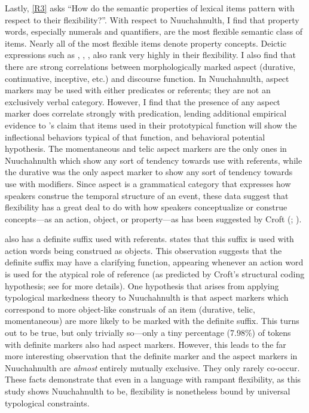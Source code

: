 Lastly, \ref{R3} asks \enquote{How do the semantic properties of lexical items pattern with respect to their flexibility?}. With respect to Nuuchahnulth, I find that property words, especially numerals and quantifiers, are the most flexible semantic class of items. Nearly all of the most flexible items denote property concepts. Deictic expressions such as , , ,  also rank very highly in their flexibility. I also find that there are strong correlations between morphologically marked aspect (durative, continuative, inceptive, etc.) and discourse function. In Nuuchahnulth, aspect markers may be used with either predicates or referents; they are not an exclusively verbal category. However, I find that the presence of any aspect marker does correlate strongly with predication, lending additional empirical evidence to \citeauthor{HopperThompson1984}'s \parencite*{HopperThompson1984} claim that items used in their prototypical function will show the inflectional behaviors typical of that function, and  behavioral potential hypothesis. The momentaneous and telic aspect markers are the only ones in Nuuchahnulth which show any sort of tendency towards use with referents, while the durative was the only aspect marker to show any sort of tendency towards use with modifiers. Since aspect is a grammatical category that expresses how speakers construe the temporal structure of an event, these data suggest that flexibility has a great deal to do with how speakers conceptualize or construe concepts—as an action, object, or property—as has been suggested by Croft (\citeyear[99]{Croft1991}; \citeyear[104]{Croft2001b}).

 also has a definite suffix  used with referents. \textcite[48]{Nakayama2001} states that this suffix is used with action words being construed as objects. This observation suggests that the definite suffix may have a clarifying function, appearing whenever an action word is used for the atypical role of reference (as predicted by Croft's structural coding hypothesis; see  for more details). One hypothesis that arises from applying typological markedness theory to Nuuchahnulth is that aspect markers which correspond to more object-like construals of an item (durative, telic, momentaneous) are more likely to be marked with the definite suffix. This turns out to be true, but only trivially so—only a tiny percentage (7.98\%) of tokens with definite markers also had aspect markers. However, this leads to the far more interesting observation that the definite marker and the aspect markers in Nuuchahnulth are \emph{almost} entirely mutually exclusive. They only rarely co-occur. These facts demonstrate that even in a language with rampant flexibility, as this study shows Nuuchahnulth to be, flexibility is nonetheless bound by universal typological constraints.


